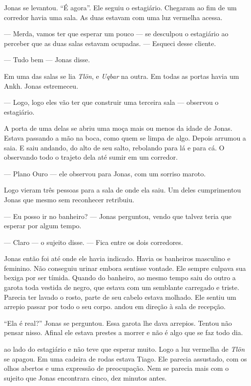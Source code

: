 Jonas se levantou. ``É agora''. Ele seguiu o estagiário. Chegaram ao fim de um corredor havia uma sala. As duas estavam com uma luz vermelha acessa.

--- Merda, vamos ter que esperar um pouco --- se desculpou o estagiário\mudanca{,} ao perceber que as duas salas estavam ocupadas. --- Esqueci desse cliente.

--- Tudo bem --- Jonas disse.

Em uma das salas se lia \emph{Tlön}, e \emph{Uqbar} na outra. Em todas as portas havia um Ankh. Jonas estremeceu.

--- Logo, logo eles vão ter que construir uma terceira sala --- observou o estagiário.

A porta de uma delas se abriu uma moça mais ou menos da idade de Jonas. Estava passando a mão na boca, como quem se limpa de algo. Depois arrumou a saia. E saiu andando, do alto de seu salto, rebolando para lá e para cá. O  observando todo o trajeto dela\mudanca{,} até sumir em um corredor.

--- Plano Ouro --- ele observou para Jonas, com um sorriso maroto.

Logo vieram três pessoas para a sala de onde ela saiu. Um deles cumprimentou Jonas\mudanca{,} que mesmo sem reconhecer retribuiu.

--- Eu posso ir no banheiro? --- Jonas perguntou, vendo que talvez teria que esperar por algum tempo.

--- Claro --- o sujeito disse. --- Fica entre os dois corredores.

Jonas então foi até onde ele havia indicado. Havia os banheiros masculino e feminino. Não conseguiu urinar\mudanca{,} embora sentisse vontade. Ele sempre culpava sua bexiga por ser tímida. Quando  do banheiro, ao mesmo tempo saiu do outro a garota toda vestida de negro, que estava com um semblante carregado e triste. Parecia ter lavado o rosto,  parte de seu cabelo estava molhado. Ele sentiu um arrepio passar por todo o seu corpo.  andou em direção à sala de recepção.

``Ela é real?'' Jonas se perguntou. Essa garota lhe dava arrepios. Tentou não pensar nisso. Afinal\mudanca{,} ele estava prestes a morrer\mudanca{,} e  não é algo que se faz todo dia.

 ao lado do estagiário e não teve que esperar muito. Logo a luz vermelha de \emph{Tlön} se apagou. Em uma cadeira de rodas estava Tiago. Ele parecia assustado, com os olhos abertos e uma expressão de preocupação. Nem se parecia mais com o sujeito que Jonas encontrara cinco, dez minutos antes.


